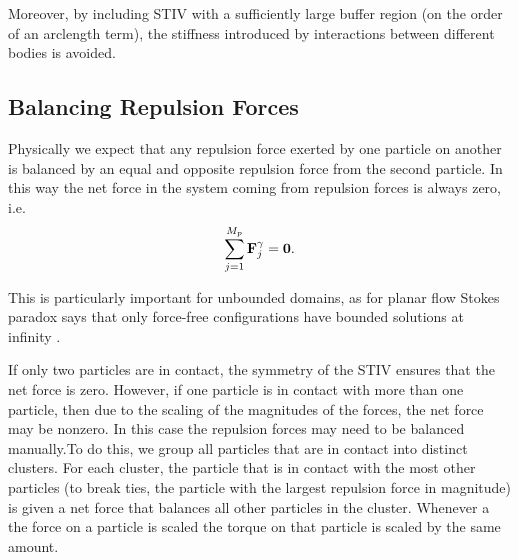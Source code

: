 \documentclass[preprint, 10pt]{elsarticle}
\begin{document}
Moreover, by including STIV with a sufficiently large buffer
region (on the order of an arclength term), the stiffness introduced by
interactions between different bodies is avoided. 


\subsection{Balancing Repulsion Forces}


Physically we expect that any repulsion force exerted by one particle on another is balanced by an
equal and opposite repulsion force from the second particle.
In this way the net force in the system coming from repulsion forces is always
zero, i.e.
\begin{equation*}
	\sum\limits_{j=1}^{M_p} {\mathbf{F}}^\gamma_j = \mathbf{0}.
\end{equation*}

This is particularly important for unbounded domains, as for planar flow Stokes
paradox says that only force-free configurations have bounded solutions at
infinity \cite{Power1993, Pozrikidis1992}.

If only two particles are in contact, the symmetry of the STIV ensures that the
net force is zero. However, if one particle is in contact with more than one
particle, then due to the scaling of the magnitudes of the forces, the net force may be nonzero. In
this case the repulsion forces may need to be balanced manually.To do this, we group all particles
that are in contact into distinct clusters.
For each cluster, the particle that is in contact with the most other particles
(to break ties, the particle with the largest repulsion force in magnitude) is
given a net force that balances all other particles in the
cluster. Whenever a the force on a particle is scaled the torque on that
particle is scaled by the same amount.
\end{document}
